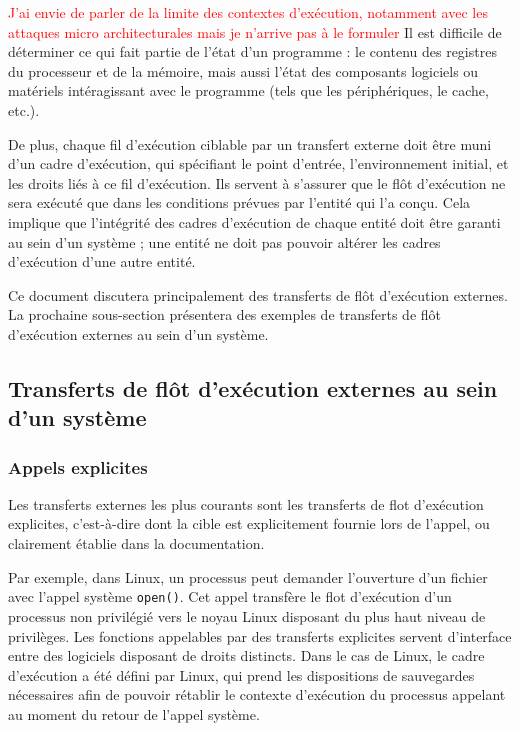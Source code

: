 \textcolor{red}{J'ai envie de parler de la limite des contextes d'exécution, notamment avec les attaques micro architecturales mais je n'arrive pas à le formuler} Il est difficile de déterminer ce qui fait partie de l'état d'un programme : le contenu des registres du processeur et de la mémoire, mais aussi l'état des composants logiciels ou matériels intéragissant avec le programme (tels que les périphériques, le cache, etc.).

			De plus, chaque fil d'exécution ciblable par un transfert externe doit être muni d'un cadre d'exécution, qui spécifiant le point d'entrée, l'environnement initial, et les droits liés à ce fil d'exécution. Ils servent à s'assurer que le flôt d'exécution ne sera exécuté que dans les conditions prévues par l'entité qui l'a conçu. Cela implique que l'intégrité des cadres d'exécution de chaque entité doit être garanti au sein d'un système ; une entité ne doit pas pouvoir altérer les cadres d'exécution d'une autre entité.

			Ce document discutera principalement des transferts de flôt d'exécution externes. La prochaine sous-section présentera des exemples de transferts de flôt d'exécution externes au sein d'un système. 

		\subsection{Transferts de flôt d'exécution externes au sein d'un système}

			\subsubsection{Appels explicites}
			Les transferts externes les plus courants sont les transferts de flot d'exécution explicites, c'est-à-dire dont la cible est explicitement fournie lors de l’appel, ou clairement établie dans la documentation.

Par exemple, dans Linux, un processus peut demander l’ouverture d’un fichier avec l’appel système \texttt{open()}. Cet appel transfère le flot d’exécution d’un processus non privilégié vers le noyau Linux disposant du plus haut niveau de privilèges. Les fonctions appelables par des transferts explicites servent d’interface entre des logiciels disposant de droits distincts. Dans le cas de Linux, le cadre d'exécution a été défini par Linux, qui prend les dispositions de sauvegardes nécessaires afin de pouvoir rétablir le contexte d'exécution du processus appelant au moment du retour de l'appel système.

